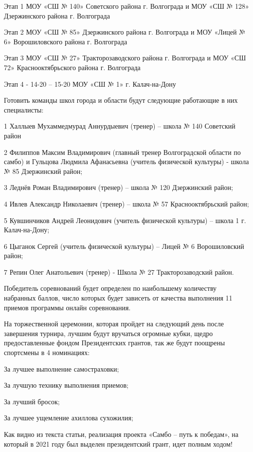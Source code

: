 Этап  1 МОУ «СШ № 140» Советского района г. Волгограда и МОУ «СШ № 128»
Дзержинского района г. Волгограда

Этап  2 МОУ «СШ № 85» Дзержинского района г. Волгограда и МОУ «Лицей № 6»
Ворошиловского района г. Волгограда

Этап 3 МОУ «СШ № 27» Тракторозаводского района г. Волгограда и  МОУ «СШ 72»
Краснооктябрьского района г. Волгограда

Этап 4 - 14-20 – 15-20 МОУ «СШ № 1» г. Калач-на-Дону

Готовить команды школ города и области будут следующие работающие в них
специалисты: 

1 Халлыев Мухаммедмурад Аннурдыевич (тренер) – школа № 140 Советский район

2 Филиппов Максим Владимирович (главный тренер Волгоградской области по самбо)
и Гульцова Людмила Афанасьевна (учитель физической культуры)    - школа № 85
Дзержинский район;

3 Леднёв Роман Владимирович (тренер)  – школа № 120 Дзержинский район; 

4 Ивлев Александр Николаевич (тренер)  – школа № 57 Краснооктябрьский район; 

5 Кувшинчиков Андрей Леонидович (учитель физической культуры) – школа 1 г.
Калач-на-Дону; 

6 Цыганок Сергей (учитель физической культуры) – Лицей № 6 Ворошиловский район; 

7 Репин Олег Анатольевич (тренер) - Школа № 27 Тракторозаводский район. 

Победитель соревнований будет определен по наибольшему количеству набранных
баллов, число которых будет зависеть от качества выполнения 11 приемов
программы онлайн соревнования. 

На торжественной церемонии, которая пройдет на следующий день после завершения
турнира, лучшим будут вручаться огромные кубки, щедро предоставленные фондом
Президентских грантов, так же будут поощрены спортсмены в 4 номинациях:

За лучшее выполнение  самостраховки;  

За лучшую технику выполнения приемов;  

За лучший бросок;  

За лучшее  ущемление  ахиллова сухожилия; 

Как видно из текста статьи, реализация проекта «Самбо – путь к победам», на
который в 2021 году был выделен президентский грант, идет полным ходом!
